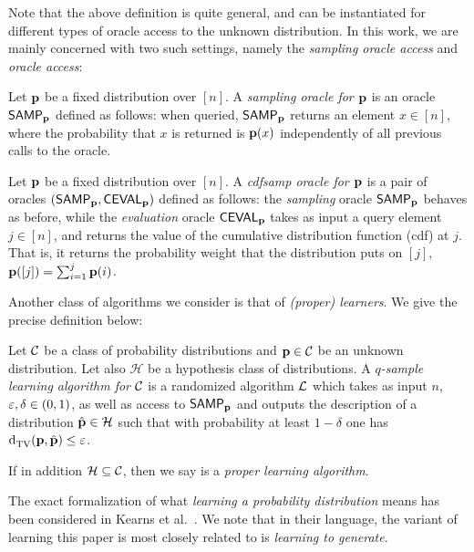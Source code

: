 Note that the above definition is quite general, and can be instantiated for different types of oracle access to the unknown distribution. In this work, we are mainly concerned with two such settings, namely the \emph{sampling oracle access} and \emph{\Cdfsamp oracle access}:
  \begin{definition}\label{def:sampling:oracle}
      Let $\mathbf{p}$ be a fixed distribution over $[n]$. A \emph{sampling oracle for $\mathbf{p}$} is an oracle ${\sf SAMP}_{\mathbf{p}}$ defined as follows: when queried, ${\sf SAMP}_{\mathbf{p}}$ returns an element $x\in[n]$, where the probability that $x$ is returned is $\mathbf{p}(x)$ independently of all previous calls to the oracle.
  \end{definition}
    \begin{definition}\label{def:extended:oracle}
    Let $\mathbf{p}$ be a fixed distribution over $[n]$. A \emph{cdfsamp oracle for $\mathbf{p}$} is a pair of oracles $({\sf SAMP}_{\mathbf{p}}, {\sf CEVAL}_{\mathbf{p}})$ defined as follows: the \emph{sampling} oracle ${\sf SAMP}_{\mathbf{p}}$ behaves as before, while the \emph{evaluation} oracle ${\sf CEVAL}_{\mathbf{p}}$ takes as input a query element $j\in[n]$, and returns the value of the cumulative distribution function (cdf) at $j$. That is, it returns the probability weight that the distribution puts on $[j]$, $\mathbf{p}([j])=\sum_{i=1}^j \mathbf{p}(i)$.
    \end{definition}  

\noindent Another class of algorithms we consider is that of \emph{(proper) learners}. We give the precise definition below:  
\begin{definition}[Learning]
Let $\mathcal{C}$ be a class of probability distributions and $\mathbf{p}\in \mathcal{C}$ be an unknown distribution. Let also $\mathcal{H}$ be a hypothesis class of distributions. 
A \emph{$q$-sample learning algorithm for $\mathcal{C}$} is a randomized algorithm $\mathcal{L}$ which takes as input $n$, $\varepsilon,\delta\in(0,1)$, as well as access to ${\sf SAMP}_{\mathbf{p}}$ and  outputs the description of a distribution $\hat{\mathbf{p}}\in \mathcal{H}$ such that with probability at least $1-\delta$ one has ${\operatorname{d}_{\textrm{TV}}^{}\!\left({\mathbf{p}, \hat{\mathbf{p}}}\right)}\leq \varepsilon$. 

\noindent If in addition $\mathcal{H}\subseteq \mathcal{C}$, then we say \Learner is a \emph{proper learning algorithm}.   
\end{definition}

The exact formalization of what \emph{learning a probability distribution} means has been considered in  Kearns et al.~\cite{Kearns:94}. We note that in their language, the variant of learning this paper is most closely related to is \emph{learning to generate}.
